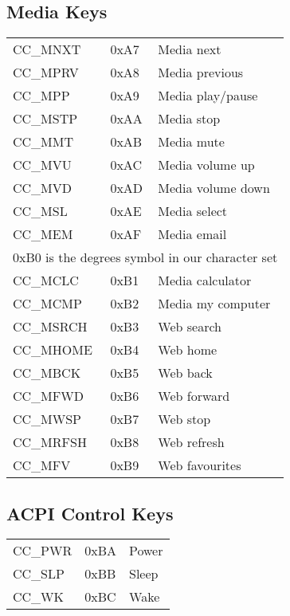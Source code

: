 \subsection{Media Keys}
\begin{tabular}{llp{7cm}}
 CC\_MNXT&0xA7&Media next\\
 CC\_MPRV&0xA8&Media previous\\
 CC\_MPP&0xA9&Media play/pause\\
 CC\_MSTP&0xAA&Media stop\\
 CC\_MMT&0xAB&Media mute\\
 CC\_MVU&0xAC&Media volume up\\
 CC\_MVD&0xAD&Media volume down\\
 CC\_MSL&0xAE&Media select\\
 CC\_MEM&0xAF&Media email\\
 \multicolumn{3}{c}{0xB0 is the degrees symbol in our character set}\\
 CC\_MCLC&0xB1&Media calculator\\
 CC\_MCMP&0xB2&Media my computer\\
 CC\_MSRCH&0xB3&Web search\\
 CC\_MHOME&0xB4&Web home\\
 CC\_MBCK&0xB5&Web back\\
 CC\_MFWD&0xB6&Web forward\\
 CC\_MWSP&0xB7&Web stop\\
 CC\_MRFSH&0xB8&Web refresh\\
 CC\_MFV&0xB9&Web favourites\\
\end{tabular}

\subsection{ACPI Control Keys}
\begin{tabular}{llp{7cm}}
 CC\_PWR&0xBA&Power\\
 CC\_SLP&0xBB&Sleep\\
 CC\_WK&0xBC&Wake\\
 
\end{tabular}
